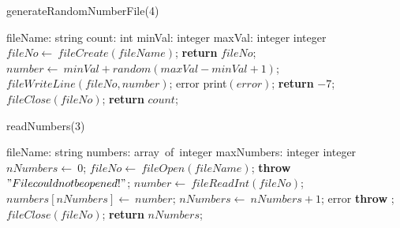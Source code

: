 \documentclass[a4paper,10pt]{article}
\begin{document}
\begin{algorithm}
\caption{generateRandomNumberFile(4)}
\begin{algorithmic}[5]
\State {}
\State {}
\State {}
\State {}
    \State fileName: string
    \State count: int
    \State minVal: integer
    \State maxVal: integer
  \EndDecl
    \State integer
  \EndDecl
  \State \(fileNo\gets\ fileCreate(fileName)\);
    \State \textbf{return} \(fileNo\);
  \EndIf
  \Try
      \State \(number\gets\ minVal+random(maxVal-minVal+1)\);
      \State \(fileWriteLine(fileNo,number)\);
    \EndFor
  \EndTry
  \Catch error
    \State \(\)print\((error)\);
    \State \textbf{return} \(-7\);
  \EndCatch %
  \Finally
    \State \(fileClose(fileNo)\);
  \EndFinally
  \State \textbf{return} \(count\);
\EndFunction
\end{algorithmic}
\end{algorithm}


\begin{algorithm}
\caption{readNumbers(3)}
\begin{algorithmic}[5]
\State {}
\State {}
\State {}
    \State fileName: string
    \State numbers: array\ of\ integer
    \State maxNumbers: integer
  \EndDecl
    \State integer
  \EndDecl
  \State \(nNumbers\gets\ 0\);
  \State \(fileNo\gets\ fileOpen(fileName)\);
    \State \textbf{throw} \("File could not be opened!"\);
  \EndIf
  \Try
      \State \(number\gets\ fileReadInt(fileNo)\);
      \State \(numbers[nNumbers]\gets\ number\);
      \State \(nNumbers\gets\ nNumbers+1\);
    \EndWhile
  \EndTry
  \Catch error
    \State \textbf{throw} \(\);
  \EndCatch %
  \Finally
    \State \(fileClose(fileNo)\);
  \EndFinally
  \State \textbf{return} \(nNumbers\);
\EndFunction
\end{algorithmic}
\end{algorithm}
\end{document}
